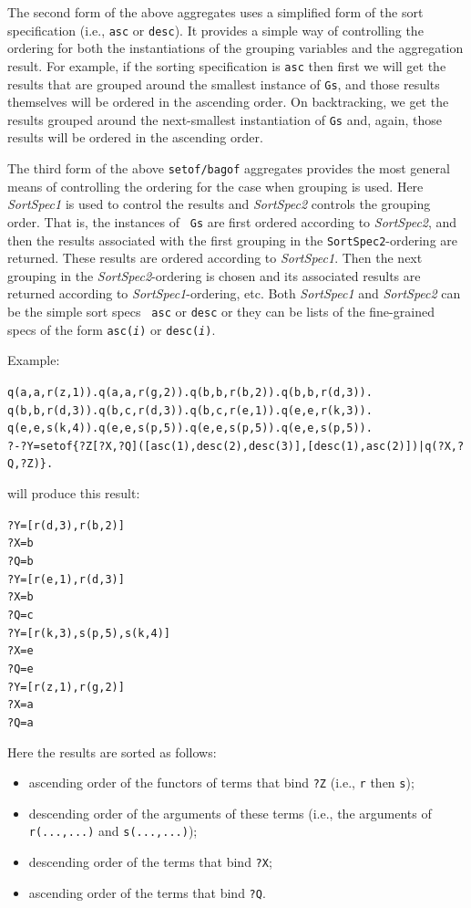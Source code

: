 \documentclass[11pt]{article}
\begin{document}
The second form of the above aggregates uses a simplified form of the sort
specification (i.e., {\tt asc} or {\tt desc}). It provides a simple way of
controlling the ordering for both the instantiations of the grouping variables  
and the aggregation result. For example, if the sorting specification is
{\tt asc} then first we will get the results that are grouped around the
smallest instance of {\tt Gs}, and those results themselves will be ordered
in the ascending order. On backtracking, we get the results grouped around
the next-smallest instantiation of {\tt Gs} and, again, those results will
be ordered in the ascending order.

The third form of the above {\tt setof/bagof} aggregates provides the most
general means of controlling the ordering for the case when grouping is
used. Here {\it SortSpec1} is used to control the results and {\it
  SortSpec2} controls the grouping order.  That is, the instances of {\tt
  Gs} are first ordered according to {\it SortSpec2}, and then the results
associated with the first grouping in the {\tt SortSpec2}-ordering are
returned. These results are ordered according to {\it SortSpec1}. Then the
next grouping in the \emph{SortSpec2}-ordering is chosen and its associated
results are returned according to {\it SortSpec1}-ordering, etc. 
Both {\it SortSpec1} and {\it SortSpec2} can be the simple sort specs {\tt
  asc} or \texttt{desc}  or they can be lists of the
fine-grained specs of the form
{\tt asc({\it i})} or \texttt{desc({\it i})}.

\noindent
Example:
\begin{alltt}
  q(a,a,r(z,1)). q(a,a,r(g,2)). q(b,b,r(b,2)). q(b,b,r(d,3)).
  q(b,b,r(d,3)). q(b,c,r(d,3)). q(b,c,r(e,1)). q(e,e,r(k,3)).
  q(e,e,s(k,4)). q(e,e,s(p,5)). q(e,e,s(p,5)). q(e,e,s(p,5)).\vspace{2mm}
  ?- ?Y = setof\{?Z[?X,?Q]([asc(1),desc(2),desc(3)],[desc(1),asc(2)])|q(?X,?Q,?Z)\}.
\end{alltt}
will produce this result:
\begin{alltt}
  ?Y = [r(d,3), r(b,2)]
  ?X = b
  ?Q = b \vspace{2mm}
  ?Y = [r(e,1), r(d,3)]
  ?X = b
  ?Q = c \vspace{2mm}
  ?Y = [r(k,3), s(p,5), s(k,4)]
  ?X = e
  ?Q = e \vspace{2mm}
  ?Y = [r(z,1), r(g,2)]
  ?X = a
  ?Q = a
\end{alltt}
Here the results are sorted as follows:
\begin{itemize}
\item  ascending order of the functors of terms that bind \texttt{?Z}
  (i.e., \texttt{r} then \texttt{s});
\item descending order of the arguments of these terms (i.e., the arguments
  of \texttt{r(...,...)} and \texttt{s(...,...)});
\item descending order of the terms that bind \texttt{?X};
\item ascending order of the terms that bind \texttt{?Q}. 
\end{itemize}
\end{document}
